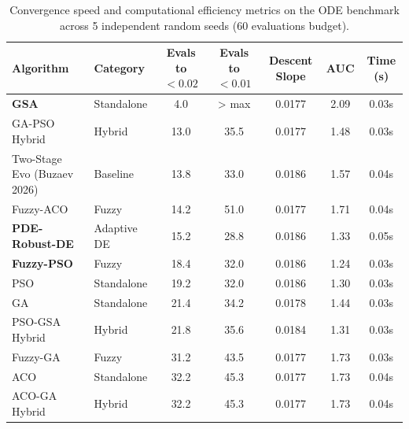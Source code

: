 \begin{table}[htbp]
\centering
\caption{Convergence speed and computational efficiency metrics on the ODE benchmark across 5 independent random seeds (60 evaluations budget).}
\label{tab:convergence_speed}
\small
\begin{tabular}{llccccc}
\toprule
\textbf{Algorithm} & \textbf{Category} & \textbf{Evals to $<0.02$} & \textbf{Evals to $<0.01$} & \textbf{Descent Slope} & \textbf{AUC} & \textbf{Time (s)} \\
\midrule
\textbf{GSA}                       & Standalone     &     4.0      &    > max     &    0.0177     &  2.09  &  0.03s   \\
GA-PSO Hybrid                      & Hybrid         &     13.0     &     35.5     &    0.0177     &  1.48  &  0.03s   \\
Two-Stage Evo (Buzaev 2026)        & Baseline       &     13.8     &     33.0     &    0.0186     &  1.57  &  0.04s   \\
Fuzzy-ACO                          & Fuzzy          &     14.2     &     51.0     &    0.0177     &  1.71  &  0.04s   \\
\textbf{PDE-Robust-DE}             & Adaptive DE    &     15.2     &     28.8     &    0.0186     &  1.33  &  0.05s   \\
\textbf{Fuzzy-PSO}                 & Fuzzy          &     18.4     &     32.0     &    0.0186     &  1.24  &  0.03s   \\
PSO                                & Standalone     &     19.2     &     32.0     &    0.0186     &  1.30  &  0.03s   \\
GA                                 & Standalone     &     21.4     &     34.2     &    0.0178     &  1.44  &  0.03s   \\
PSO-GSA Hybrid                     & Hybrid         &     21.8     &     35.6     &    0.0184     &  1.31  &  0.03s   \\
Fuzzy-GA                           & Fuzzy          &     31.2     &     43.5     &    0.0177     &  1.73  &  0.03s   \\
ACO                                & Standalone     &     32.2     &     45.3     &    0.0177     &  1.73  &  0.04s   \\
ACO-GA Hybrid                      & Hybrid         &     32.2     &     45.3     &    0.0177     &  1.73  &  0.04s   \\
\bottomrule
\end{tabular}
\end{table}

